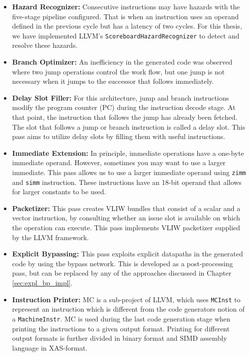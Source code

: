 \begin{itemize}
	\item \textbf{Hazard Recognizer:} Consecutive instructions may have hazards with the five-stage pipeline configured. That is when an instruction uses an operand defined in the previous cycle but has a latency of two cycles. For this thesis, we have implemented LLVM's \texttt{ScoreboardHazardRecognizer} to detect and resolve these hazards.
	\item \textbf{Branch Optimizer:} An inefficiency in the generated code was observed where two jump operations control the work flow, but one jump is not necessary when it jumps to the successor that follows immediately. 
	\item \textbf{Delay Slot Filler:} For this architecture, jump and branch instructions modify the program counter (PC) during the instruction decode stage. At that point, the instruction that follows the jump has already been fetched. The slot that follows a jump or branch instruction is called a delay slot. This pass aims to utilize delay slots by filling them with useful instructions.%
	\item \textbf{Immediate Extension:} In principle, immediate operations have a one-byte immediate operand. However, sometimes you may want to use a larger immediate. This pass allows us to use a larger immediate operand using \texttt{zimm} and \texttt{simm} instruction. These instructions have an 18-bit operand that allows for larger constants to be used.%
	\item \textbf{Packetizer:} This pass creates VLIW bundles that consist of a scalar and a vector instruction, by consulting whether an issue slot is available on which the operation can execute. This pass implements VLIW packetizer supplied by the LLVM framework.
	\item \textbf{Explicit Bypassing:} This pass exploits explicit datapaths in the generated code by using the bypass network. This is developed as a post-processing pass, but can be replaced by any of the approaches discussed in Chapter \ref{sec:expl_bp_impl}.
	\item \textbf{Instruction Printer:} MC is a sub-project of LLVM, which uses \texttt{MCInst} to represent an instruction which is different from the code generators notion of a \texttt{MachineInstr}. MC is used during the last code generation stage when printing the instructions to a given output format. Printing for different output formats is further divided in binary format and SIMD assembly language in XAS-format. 
\end{itemize}


